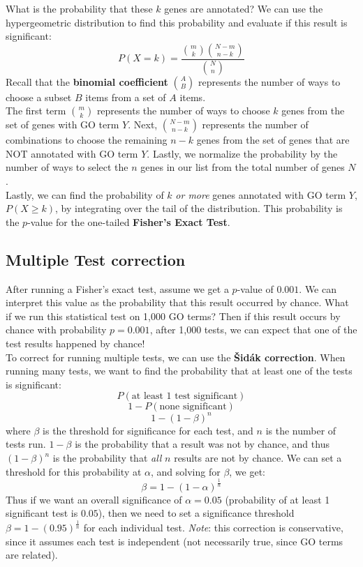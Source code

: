 \documentclass[12pt]{article}
\begin{document}
What is the probability that these $k$ genes are annotated? We can use the hypergeometric distribution to find this probability and evaluate if this result is significant:
$$P(X = k) =  \frac{\binom{m}{k} \binom{N-m}{n-k}}{\binom{N}{n}}$$
Recall that the \textbf{binomial coefficient} $\binom{A}{B}$ represents the number of ways to choose a subset $B$ items from a set of $A$ items.\\[10pt]
The first term $\binom{m}{k}$ represents the number of ways to choose $k$ genes from the set of genes with GO term $Y$. Next, $\binom{N-m}{n-k}$ represents the number of combinations to choose the remaining $n-k$ genes from the set of genes that are NOT annotated with GO term $Y$. Lastly, we normalize the probability by the number of ways to select the $n$ genes in our list from the total number of genes $N$.\\[10pt]
Lastly, we can find the probability of $k$ \textit{or more} genes annotated with GO term $Y$, $P(X\geq k)$, by integrating over the tail of the distribution. This probability is the $p$-value for the one-tailed \textbf{Fisher's Exact Test}. 

\subsection{Multiple Test correction}
After running a Fisher's exact test, assume we get a $p$-value of $0.001$. We can interpret this value as the probability that this result occurred by chance. What if we run this statistical test on 1,000 GO terms? Then if this result occurs by chance with probability $p = 0.001$, after 1,000 tests, we can expect that one of the test results happened by chance!\\[10pt]
To correct for running multiple tests, we can use the \textbf{Šidák correction}. When running many tests, we want to find the probability that at least one of the tests is significant:
$$P(\text{at least 1 test significant})$$
$$1 - P(\text{none significant})$$
$$1 - (1 - \beta)^n$$
where $\beta$ is the threshold for significance for each test, and $n$ is the number of tests run. $1-\beta$ is the probability that a result was not by chance, and thus $(1-\beta)^n$ is the probability that \textit{all} $n$ results are not by chance. We can set a threshold for this probability at $\alpha$, and solving for $\beta$, we get:
$$\beta = 1 - (1 - \alpha)^\frac{1}{n}$$
Thus if we want an overall significance of $\alpha = 0.05$ (probability of at least 1 significant test is $0.05$), then we need to set a significance threshold $\beta = 1 - (0.95)^\frac{1}{n}$ for each individual test. \textit{Note}: this correction is conservative, since it assumes each test is independent (not necessarily true, since GO terms are related).
\end{document}
